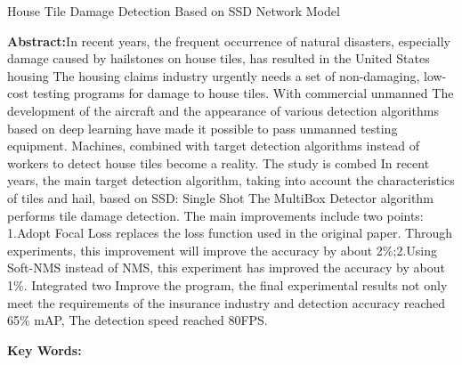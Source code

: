\rule{0pt}{0pt} 
\begin{center}
	\heiti {} House Tile Damage Detection Based on SSD Network Model
\end{center}
\rule{0pt}{0pt} 
\par \noindent
\textbf{\songti {}Abstract:}\quad In recent years, the frequent occurrence of natural disasters, especially damage caused by hailstones on house tiles, has resulted in the United States housing
The housing claims industry urgently needs a set of non-damaging, low-cost testing programs for damage to house tiles. With commercial unmanned
The development of the aircraft and the appearance of various detection algorithms based on deep learning have made it possible to pass unmanned testing equipment.
Machines, combined with target detection algorithms instead of workers to detect house tiles become a reality. The study is combed
In recent years, the main target detection algorithm, taking into account the characteristics of tiles and hail, based on SSD: Single Shot
The MultiBox Detector algorithm performs tile damage detection. The main improvements include two points: 1.Adopt Focal
Loss replaces the loss function used in the original paper. Through experiments, this improvement will improve the accuracy by about 2\%;2.Using Soft-NMS instead of NMS, this experiment has improved the accuracy by about 1\%. Integrated two
Improve the program, the final experimental results not only meet the requirements of the insurance industry and detection accuracy reached 65\% mAP,
The detection speed reached 80FPS.~\\

\par \noindent
\textbf{\songti {}Key Words:}
